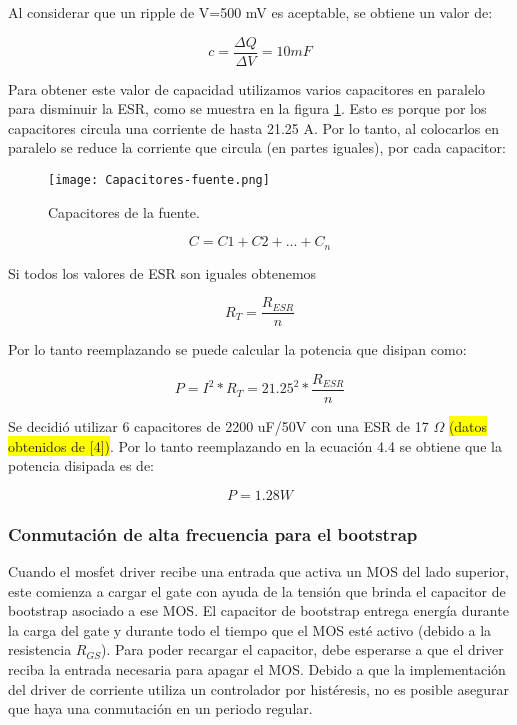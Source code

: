 \noindent Al considerar que un ripple de V=500 mV es aceptable, se obtiene un valor de:

\begin{equation} 
	c = \frac{\Delta Q}{\Delta V} = 10 mF
\end{equation}

\noindent Para obtener este valor de capacidad utilizamos varios capacitores en paralelo para disminuir la ESR, como se muestra en la figura \ref{fig:img_capacitores-fuente}. Esto es porque por los capacitores circula una corriente de hasta 21.25 A. Por lo tanto, al colocarlos en paralelo se reduce la corriente que circula (en partes iguales), por cada capacitor:


\begin{figure}[H]
	\centering
	\texttt{[image: Capacitores-fuente.png]}
	\caption{Capacitores de la fuente.}
	\label{fig:img_capacitores-fuente}
\end{figure}


\begin{equation} 
	C = C1 + C2 + ... + C_n
\end{equation}


\noindent Si todos los valores de ESR son iguales obtenemos

\begin{equation} 
R_T = \frac{R_{ESR}}{n}
\end{equation}

\noindent Por lo tanto reemplazando se puede calcular la potencia que disipan como:

\begin{equation} 
	P = I^2 * R_T = 21.25^2 * \frac{R_{ESR}}{n}
\end{equation}

\noindent Se decidió utilizar 6 capacitores  de 2200 uF/50V con una ESR de 17 $\Omega$ \colorbox{yellow}{(datos obtenidos de [4])}. Por lo tanto reemplazando en la ecuación 4.4 se obtiene que la potencia disipada es de: 

\begin{equation} 
	P=1.28 W
\end{equation}


\subsubsection{Conmutación de alta frecuencia para el bootstrap}

\noindent Cuando el mosfet driver recibe una entrada que activa un MOS del lado superior, este comienza a cargar el gate con ayuda de la tensión que brinda el capacitor de bootstrap asociado a ese MOS. El capacitor de bootstrap entrega energía durante la carga del gate y durante todo el tiempo que el MOS esté activo (debido a la resistencia $R_{GS}$). Para poder recargar el capacitor, debe esperarse a que el driver reciba la entrada necesaria para apagar el MOS. Debido a que la implementación del driver de corriente utiliza un controlador por histéresis, no es posible asegurar que haya una conmutación en un periodo regular.


